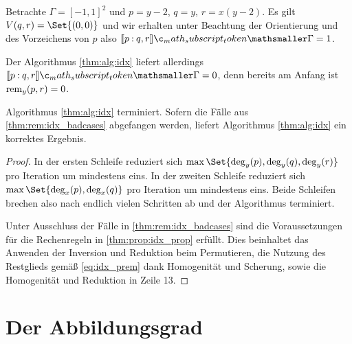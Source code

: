\documentclass{mythesis}
\begin{document}
\begin{example} \label{thm:ex:idx_nullext}
    Betrachte $\Gamma = [-1,1]^2$ und $p = y - 2$, $q = y$, $r = x(y - 2)$.
    Es gilt $V(q,r) = \Set{(0,0)}$ und wir erhalten unter Beachtung der Orientierung und des Vorzeichens von $p$ also $\Index{\Gamma}{p}{q,r} = 1$.

    Der Algorithmus \ref{thm:alg:idx} liefert allerdings $\Index{\Gamma}{p}{q,r} = 0$, denn bereits am Anfang ist $\operatorname{rem}_y(p,r) = 0$.
\end{example}

\begin{proposition}
    Algorithmus \ref{thm:alg:idx} terminiert.
    Sofern die Fälle aus \ref{thm:rem:idx_badcases} abgefangen werden, liefert Algorithmus \ref{thm:alg:idx} ein korrektes Ergebnis.
    \begin{proof}
        In der ersten Schleife reduziert sich $\max\Set{\deg_y(p), \deg_y(q), \deg_y(r)}$ pro Iteration um mindestens eins.
        In der zweiten Schleife reduziert sich $\max\Set{\deg_x(p), \deg_x(q)}$ pro Iteration um mindestens eins.
        Beide Schleifen brechen also nach endlich vielen Schritten ab und der Algorithmus terminiert.

        Unter Ausschluss der Fälle in \ref{thm:rem:idx_badcases} sind die Voraussetzungen für die Rechenregeln in \ref{thm:prop:idx_prop} erfüllt.
        Dies beinhaltet das Anwenden der Inversion und Reduktion beim Permutieren, die Nutzung des Restglieds gemäß \eqref{eq:idx_prem} dank Homogenität und Scherung, sowie die Homogenität und Reduktion in Zeile 13.
    \end{proof}
\end{proposition}


\section{Der Abbildungsgrad}
\end{document}
